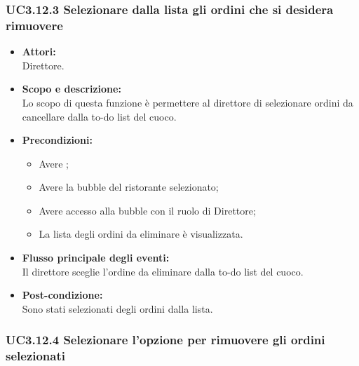 \subsubsection{UC3.12.3 Selezionare dalla lista gli ordini che si desidera rimuovere} \label{UC3.12.3}

\begin{itemize}
	\item \textbf{Attori:}
	\\Direttore.
	\item \textbf{Scopo e descrizione:} 
	\\Lo scopo di questa funzione è permettere al direttore di selezionare ordini da cancellare dalla to-do list del cuoco.
	\item \textbf{Precondizioni:}
	\begin{itemize}
		\item Avere ;
		\item Avere la bubble del ristorante selezionato;
		\item Avere accesso alla bubble con il ruolo di Direttore;
		\item La lista degli ordini da eliminare è visualizzata.
	\end{itemize}
	\item \textbf{Flusso principale degli eventi:}
	\\Il direttore sceglie l’ordine da eliminare dalla to-do list del cuoco.
	\item \textbf{Post-condizione:}
	\\Sono stati selezionati degli ordini dalla lista.
\end{itemize}

\subsubsection{UC3.12.4 Selezionare l’opzione per rimuovere gli ordini selezionati} \label{UC3.12.4}


